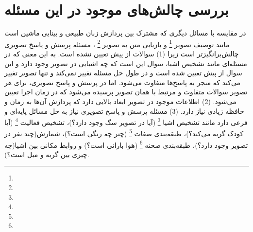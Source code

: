 \section{بررسی چالش‌های موجود در این مسئله}
در مقایسه با مسائل دیگری که مشترک بین پردازش زبان طبیعی و بینایی ماشین است مانند توصیف تصویر
\footnote{}
و بازیابی متن به تصویر
\footnote{}
، مسئله پرسش و پاسخ تصویری چالش‌برانگیزتر است زیرا (1)  سوالات از پیش تعیین نشده است. به این معنی که در مسئله‌ای مانند تشخیص اشیا، سوال این است که چه اشیایی در تصویر وجود دارد و این سوال از پیش تعیین شده است و در طول حل مسئله تغییر نمی‌کند و تنها تصویر تغییر می‌کند که منجر به پاسخ‌ها متفاوت می‌شود. اما در پرسش و پاسخ تصویری، برای هر تصویر سوالات متفاوت و مرتبط با همان تصویر پرسیده می‌شود که در زمان اجرا تعیین می‌شود. (2) اطلاعات موجود در تصویر ابعاد بالایی دارد که پردازش آن‌ها به زمان و حافظه زیادی نیاز دارد. (3) مسئله پرسش و پاسخ تصویری نیاز به حل مسائل پایه‌ای  و فرعی دارد مانند تشخیص اشیا
\footnote{}
(آیا در تصویر سگ وجود دارد؟)، تشخیص فعالیت
\footnote{}
(آیا کودک گریه می‌کند؟)، طبقه‌بندی صفات
\footnote{}
(چتر چه رنگی است؟)، شمارش(چند نفر در تصویر وجود دارد؟)، طبقه‌بندی صحنه
\footnote{}
(هوا بارانی است؟) و روابط مکانی بین اشیا(چه چیزی بین گربه و مبل است؟).

